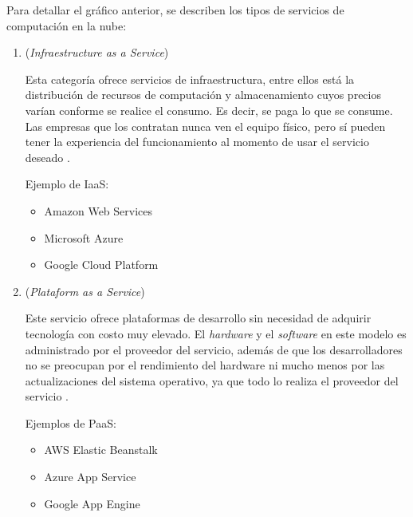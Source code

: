 
Para detallar el gráfico anterior, se describen los tipos de servicios de computación en la nube:

\vspace{1cm}

\begin{enumerate}

\item {}  (\emph{Infraestructure  as  a  Service})

Esta categoría ofrece servicios de infraestructura, entre ellos está la distribución de recursos de computación y almacenamiento cuyos precios varían conforme se realice el consumo. Es decir, se paga lo que se consume. Las empresas que los contratan nunca ven el equipo físico, pero sí pueden tener la experiencia del funcionamiento al momento de usar el servicio deseado \citep{BOOK:2}.

Ejemplo de IaaS:

\begin{itemize}
\item Amazon Web Services
\item Microsoft Azure
\item Google Cloud Platform
\end{itemize}

\vspace{0.5cm}

\item {} (\emph{Plataform as a Service})

Este servicio ofrece plataformas de desarrollo sin necesidad de adquirir tecnología con costo muy elevado. El \emph{hardware} y el \emph{software} en este modelo es administrado por el proveedor del servicio, además de que los desarrolladores no se preocupan por el rendimiento del hardware ni mucho menos por las actualizaciones del sistema operativo, ya que todo lo realiza el proveedor del servicio \citep{BOOK:2}.
 
Ejemplos de PaaS:

\begin{itemize}
\item AWS Elastic Beanstalk
\item Azure App Service
\item Google App Engine

\end{itemize}

\vspace{0.5cm}


\end{enumerate}
